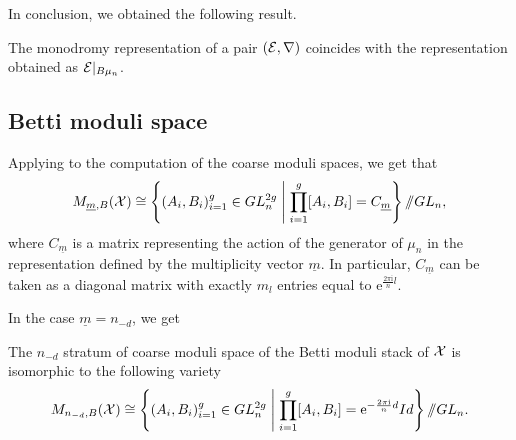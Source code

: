 In conclusion, we obtained the following result.
\begin{prop} \label{prop: monodromy representation}
The monodromy representation of a pair $(\mathcal{E}, \nabla)$ coincides with the representation obtained as $\mathcal{E}\vert_{B \mu_n}$.
\end{prop}

\subsection{Betti moduli space}

Applying  to the computation of the coarse moduli spaces, we get that
\begin{equation}
M_{\underline{m}, B}(\mathcal{X}) \cong \left\{ (A_i, B_i)_{i = 1}^g \in GL_n^{2g} \;\middle|\; \prod_{i=1}^{g}[A_i, B_i] = C_{\underline{m}} \right\} /\!\!/ GL_n,
\end{equation}
where $C_{\underline{m}}$ is a matrix representing the action of the generator of $\mu_n$ in the representation defined by the multiplicity vector $\underline{m}$.
In particular, $C_{\underline{m}}$ can be taken as a diagonal matrix with exactly $m_l$ entries equal to $\mathrm{e}^{\frac{2 \pi \mathrm{i}}{n} l}$.

In the case $\underline{m} = n_{-d}$, we get

\begin{prop}
The $n_{-d}$ stratum of coarse moduli space of the Betti moduli stack of $\mathcal{X}$ is isomorphic to the following variety
\begin{equation}
M_{n_{-d}, B}(\mathcal{X}) \cong \left\{ (A_i, B_i)_{i = 1}^g \in GL_n^{2g} \;\middle|\; \prod_{i=1}^{g}[A_i, B_i] = \mathrm{e}^{-\frac{2 \pi \mathrm{i}}{n} d} Id \right\} /\!\!/ GL_n.
\end{equation}
\end{prop}